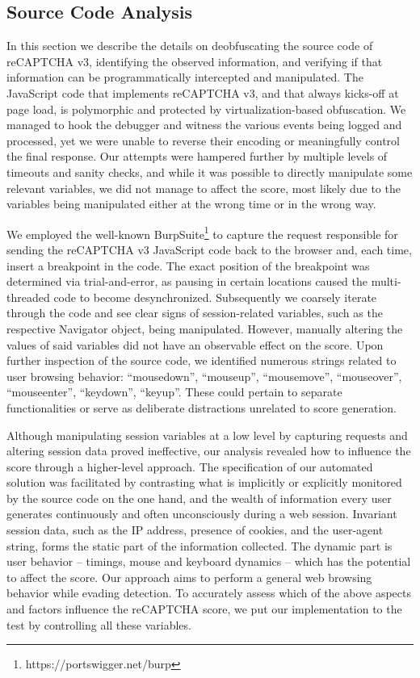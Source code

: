\subsection{Source Code Analysis}
In this section we describe the details on deobfuscating the source code of reCAPTCHA v3, identifying the observed information, and verifying if that information can be programmatically intercepted and manipulated.
The JavaScript code that implements reCAPTCHA v3, and that always kicks-off at page load, is polymorphic and protected by virtualization-based obfuscation.
We managed to hook the debugger and witness the various events being logged and processed, yet we were unable to reverse their encoding or meaningfully control the final response.
Our attempts were hampered further by multiple levels of timeouts and sanity checks, and while it was possible to directly manipulate some relevant variables, we did not manage to affect the score, most likely due to the variables being manipulated either at the wrong time or in the wrong way. 

We employed the well-known BurpSuite\footnote{https://portswigger.net/burp} to capture the request responsible for sending the reCAPTCHA v3 JavaScript code back to the browser and, each time, insert a breakpoint in the code.
The exact position of the breakpoint was determined via trial-and-error, as pausing in certain locations caused the multi-threaded code to become desynchronized.
Subsequently we coarsely iterate through the code and see clear signs of session-related variables, such as the respective Navigator object, being manipulated.
However, manually altering the values of said variables did not have an observable effect on the score. 
Upon further inspection of the source code, we identified numerous strings related to user browsing behavior: ``mousedown'', ``mouseup'', ``mousemove'', ``mouseover'', ``mouseenter'', ``keydown'', ``keyup''.
These could pertain to separate functionalities or serve as deliberate distractions unrelated to score generation.

Although manipulating session variables at a low level by capturing requests and altering session data proved ineffective, our analysis revealed how to influence the score through a higher-level approach.
The specification of our automated solution was facilitated by contrasting what is implicitly or explicitly monitored by the source code on the one hand, and the wealth of information every user generates continuously and often unconsciously during a web session.
Invariant session data, such as the IP address, presence of cookies, and the user-agent string, forms the static part of the information collected.
The dynamic part is user behavior -- timings, mouse and keyboard dynamics -- which has the potential to affect the score.
Our approach aims to perform a general web browsing behavior while evading detection.
To accurately assess which of the above aspects and factors influence the reCAPTCHA score, we put our implementation to the test by controlling all these variables.

